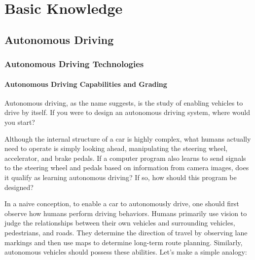 \thispagestyle{empty}
\setcounter{page}{1}
\part{Basic Knowledge}
\thispagestyle{empty}


\newpage

\chapter{Autonomous Driving}
\thispagestyle{empty}
\setcounter{chapter}{1}
\section{Autonomous Driving Technologies}
\subsection{Autonomous Driving Capabilities and Grading}
Autonomous driving, as the name suggests, is the study of enabling vehicles to drive by itself. If you were to design an autonomous driving system, where would you start?

Although the internal structure of a car is highly complex, what humans actually need to operate is simply looking ahead, manipulating the steering wheel, accelerator, and brake pedals. If a computer program also learns to send signals to the steering wheel and pedals based on information from camera images, does it qualify as learning autonomous driving? If so, how should this program be designed?

In a naive conception, to enable a car to autonomously drive, one should first observe how humans perform driving behaviors. Humans primarily use vision to judge the relationships between their own vehicles and surrounding vehicles, pedestrians, and roads. They determine the direction of travel by observing lane markings and then use maps to determine long-term route planning. Similarly, autonomous vehicles should possess these abilities. Let's make a simple analogy:

